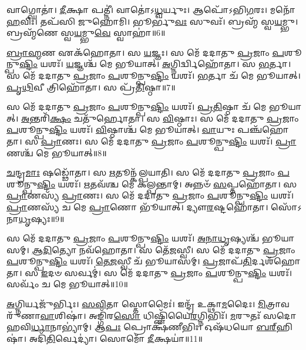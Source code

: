 𑌵𑌾𑌗𑍍𑌘𑍋𑌤𑌾॑। 
\-\ul{𑌦𑍀}\-𑌕𑍍𑌷𑌾 𑌪𑌤𑍍𑌨𑍀॑। 
𑌵𑌾𑌤𑍋॑𑌽\-\ul{𑌧𑍍𑌵}\-𑌰𑍍𑌯𑍁𑌃। 
𑌆𑌪𑍋᳴𑌽𑌭𑌿\-\ul{𑌗}\-𑌰𑌃। 
𑌮𑌨𑍋᳴ \ul{𑌹}\-𑌵𑌿𑌃। 
𑌤𑌪᳴𑌸𑌿 𑌜𑍁𑌹𑍋𑌮𑌿। 
𑌭𑍂𑌰𑍍𑌭𑍁\-\ul{𑌵𑌃} 𑌸𑍁𑌵𑌃᳴। 
𑌬𑍍𑌰𑌹𑍍𑌮᳴ 𑌸𑍍𑌵\-\ul{𑌯}\-𑌮𑍍𑌭𑍁। 
𑌬𑍍𑌰𑌹𑍍𑌮᳴𑌣𑍇 𑌸𑍍𑌵\-\ul{𑌯}\-𑌮𑍍𑌭𑍁\-\ul{𑌵𑍇} 𑌸𑍍𑌵𑌾𑌹𑌾॑॥6॥
\anuvakamend[𑌵𑌾𑌗𑍍𑌘𑍋\-\ul{𑌤𑌾} 𑌨𑌵᳴]

\-\ul{𑌬𑍍𑌰𑌾}\-\-\ul{𑌹𑍍𑌮}\-𑌣 𑌏𑌕᳴𑌹𑍋𑌤𑌾। 
𑌸 \ul{𑌯}\-𑌜𑍍𑌞𑌃। 
𑌸 𑌮𑍇᳴ 𑌦𑌦𑌾𑌤𑍁 \ul{𑌪𑍍𑌰}\-𑌜𑌾𑌂 \ul{𑌪}\-𑌶𑍂𑌨𑍍𑌪𑍁\-\ul{𑌷𑍍𑌟𑌿𑌂} 𑌯𑌶𑌃᳴। 
\-\ul{𑌯}\-𑌜𑍍𑌞𑌶𑍍𑌚᳴ 𑌮𑍇 𑌭𑍂𑌯𑌾𑌤𑍍। 
\-\ul{𑌅}\-𑌗𑍍𑌨𑌿𑌰𑍍𑌦𑍍𑌵𑌿𑌹𑍋᳴𑌤𑌾। 
𑌸 \ul{𑌭}\-𑌰𑍍𑌤𑌾। 
𑌸 𑌮𑍇᳴ 𑌦𑌦𑌾𑌤𑍁 \ul{𑌪𑍍𑌰}\-𑌜𑌾𑌂 \ul{𑌪}\-𑌶𑍂𑌨𑍍𑌪𑍁\-\ul{𑌷𑍍𑌟𑌿𑌂} 𑌯𑌶𑌃᳴। 
\-\ul{𑌭}\-𑌰𑍍𑌤𑌾 𑌚᳴ 𑌮𑍇 𑌭𑍂𑌯𑌾𑌤𑍍। 
\-\ul{𑌪𑍃}\-\-\ul{𑌥𑌿}\-𑌵𑍀 𑌤𑍍𑌰𑌿𑌹𑍋᳴𑌤𑌾। 
𑌸 𑌪𑍍𑌰᳴\-\ul{𑌤𑌿}\-𑌷𑍍𑌠𑌾॥7॥

𑌸 𑌮𑍇᳴ 𑌦𑌦𑌾𑌤𑍁 \ul{𑌪𑍍𑌰}\-𑌜𑌾𑌂 \ul{𑌪}\-𑌶𑍂𑌨𑍍𑌪𑍁\-\ul{𑌷𑍍𑌟𑌿𑌂} 𑌯𑌶𑌃᳴। 
\-\ul{𑌪𑍍𑌰}\-\-\ul{𑌤𑌿}\-𑌷𑍍𑌠𑌾 𑌚᳴ 𑌮𑍇 𑌭𑍂𑌯𑌾𑌤𑍍। 
\-\ul{𑌅}\-𑌨𑍍𑌤𑌰𑌿᳴\-\ul{𑌕𑍍𑌷𑌂} 𑌚𑌤𑍁᳴𑌰𑍍\mbox{}𑌹𑍋𑌤𑌾। 
𑌸 \ul{𑌵𑌿}\-𑌷𑍍𑌠𑌾𑌃। 
𑌸 𑌮𑍇᳴ 𑌦𑌦𑌾𑌤𑍁 \ul{𑌪𑍍𑌰}\-𑌜𑌾𑌂 \ul{𑌪}\-𑌶𑍂𑌨𑍍𑌪𑍁\-\ul{𑌷𑍍𑌟𑌿𑌂} 𑌯𑌶𑌃᳴। 
\-\ul{𑌵𑌿}\-𑌷𑍍𑌠𑌾𑌶𑍍𑌚᳴ 𑌮𑍇 𑌭𑍂𑌯𑌾𑌤𑍍। 
\-\ul{𑌵𑌾}\-𑌯𑍁𑌃 𑌪𑌞𑍍𑌚᳴𑌹𑍋𑌤𑌾। 
𑌸 \ul{𑌪𑍍𑌰𑌾}\-𑌣𑌃। 
𑌸 𑌮𑍇᳴ 𑌦𑌦𑌾𑌤𑍁 \ul{𑌪𑍍𑌰}\-𑌜𑌾𑌂 \ul{𑌪}\-𑌶𑍂𑌨𑍍𑌪𑍁\-\ul{𑌷𑍍𑌟𑌿𑌂} 𑌯𑌶𑌃᳴। 
\-\ul{𑌪𑍍𑌰𑌾}\-𑌣𑌶𑍍𑌚᳴ 𑌮𑍇 𑌭𑍂𑌯𑌾𑌤𑍍॥8॥

\-\ul{𑌚}\-𑌨𑍍𑌦𑍍𑌰\-\ul{𑌮𑌾𑌃} 𑌷𑌡𑍍𑌢𑍋᳴𑌤𑌾। 
𑌸 \ul{𑌋}\-𑌤𑍂𑌨𑍍𑌕᳴𑌲𑍍𑌪𑌯𑌾𑌤𑌿। 
𑌸 𑌮𑍇᳴ 𑌦𑌦𑌾𑌤𑍁 \ul{𑌪𑍍𑌰}\-𑌜𑌾𑌂 \ul{𑌪}\-𑌶𑍂𑌨𑍍𑌪𑍁\-\ul{𑌷𑍍𑌟𑌿𑌂} 𑌯𑌶𑌃᳴। 
\-\ul{𑌋}\-𑌤𑌵᳴𑌶𑍍𑌚 𑌮𑍇 𑌕𑌲𑍍𑌪𑌨𑍍𑌤𑌾𑌮𑍍। 
𑌅𑌨𑍍𑌨𑍞᳴ \ul{𑌸}\-𑌪𑍍𑌤𑌹𑍋᳴𑌤𑌾। 
𑌸 \ul{𑌪𑍍𑌰𑌾}\-𑌣𑌸𑍍𑌯᳴ \ul{𑌪𑍍𑌰𑌾}\-𑌣𑌃। 
𑌸 𑌮𑍇᳴ 𑌦𑌦𑌾𑌤𑍁 \ul{𑌪𑍍𑌰}\-𑌜𑌾𑌂 \ul{𑌪}\-𑌶𑍂𑌨𑍍𑌪𑍁\-\ul{𑌷𑍍𑌟𑌿𑌂} 𑌯𑌶𑌃᳴। 
\-\ul{𑌪𑍍𑌰𑌾}\-𑌣𑌸𑍍𑌯᳴ 𑌚 𑌮𑍇 \ul{𑌪𑍍𑌰𑌾}\-𑌣𑍋 𑌭𑍂᳴𑌯𑌾𑌤𑍍। 
𑌦𑍍𑌯𑍗\-\ul{𑌰}\-𑌷𑍍𑌟𑌹𑍋᳴𑌤𑌾। 
𑌸𑍋᳴𑌽𑌨𑌾\-\ul{𑌧𑍃}\-𑌷𑍍𑌯𑌃॥9॥

𑌸 𑌮𑍇᳴ 𑌦𑌦𑌾𑌤𑍁 \ul{𑌪𑍍𑌰}\-𑌜𑌾𑌂 \ul{𑌪}\-𑌶𑍂𑌨𑍍𑌪𑍁\-\ul{𑌷𑍍𑌟𑌿𑌂} 𑌯𑌶𑌃᳴। 
\-\ul{𑌅}\-\-\ul{𑌨𑌾}\-\-\ul{𑌧𑍃}\-𑌷𑍍𑌯𑌶𑍍𑌚᳴ 𑌭𑍂𑌯𑌾𑌸𑌮𑍍। 
\-\ul{𑌆}\-\-\ul{𑌦𑌿}\-𑌤𑍍𑌯𑍋 𑌨𑌵᳴𑌹𑍋𑌤𑌾। 
𑌸 𑌤𑍇᳴\-\ul{𑌜}\-𑌸𑍍𑌵𑍀। 
𑌸 𑌮𑍇᳴ 𑌦𑌦𑌾𑌤𑍁 \ul{𑌪𑍍𑌰}\-𑌜𑌾𑌂 \ul{𑌪}\-𑌶𑍂𑌨𑍍𑌪𑍁\-\ul{𑌷𑍍𑌟𑌿𑌂} 𑌯𑌶𑌃᳴। 
\-\ul{𑌤𑍇}\-\-\ul{𑌜}\-𑌸𑍍𑌵𑍀 𑌚᳴ 𑌭𑍂𑌯𑌾𑌸𑌮𑍍। 
\-\ul{𑌪𑍍𑌰}\-𑌜𑌾𑌪᳴\-\ul{𑌤𑌿}\-𑌰𑍍𑌦𑌶᳴𑌹𑍋𑌤𑌾। 
𑌸 \ul{𑌇}\-𑌦𑍞 𑌸𑌰𑍍𑌵𑌮𑍍॑। 
𑌸 𑌮𑍇᳴ 𑌦𑌦𑌾𑌤𑍁 \ul{𑌪𑍍𑌰}\-𑌜𑌾𑌂 \ul{𑌪}\-𑌶𑍂𑌨𑍍𑌪𑍁\-\ul{𑌷𑍍𑌟𑌿𑌂} 𑌯𑌶𑌃᳴। 
𑌸𑌰𑍍𑌵𑌂᳴ 𑌚 𑌮𑍇 𑌭𑍂𑌯𑌾𑌤𑍍॥10॥
\anuvakamend[\-\ul{𑌪𑍍𑌰}\-\-\ul{𑌤𑌿}\-𑌷𑍍𑌠𑌾 \ul{𑌪𑍍𑌰𑌾}\-𑌣𑌶𑍍𑌚᳴ 𑌮𑍇 𑌭𑍂𑌯𑌾𑌦𑌨𑌾\-\ul{𑌧𑍃}\-𑌷𑍍𑌯𑌃 𑌸𑌰𑍍𑌵𑌂᳴ 𑌚 𑌮𑍇 𑌭𑍂𑌯𑌾𑌤𑍍]

\-\ul{𑌅}\-𑌗𑍍𑌨𑌿𑌰𑍍𑌯𑌜𑍁᳴𑌰𑍍𑌭𑌿𑌃। 
\-\ul{𑌸}\-\-\ul{𑌵𑌿}\-𑌤𑌾 𑌸𑍍𑌤𑍋𑌮𑍈𑌃॑। 
𑌇𑌨𑍍𑌦𑍍𑌰᳴ 𑌉𑌕𑍍𑌥𑌾\-\ul{𑌮}\-𑌦𑍈𑌃। 
\-\ul{𑌮𑌿}\-𑌤𑍍𑌰𑌾𑌵𑌰𑍁᳴𑌣𑌾\-\-\ul{𑌵𑌾}\-𑌶𑌿𑌷𑌾॑। 
𑌅𑌙𑍍𑌗𑌿᳴𑌰\-\ul{𑌸𑍋} 𑌧𑌿𑌷𑍍𑌣𑌿᳴𑌯𑍈\-\ul{𑌰}\-𑌗𑍍𑌨𑌿𑌭𑌿𑌃᳴। 
\-\ul{𑌮}\-𑌰𑍁𑌤𑌃᳴ 𑌸𑌦𑍋𑌹𑌵𑌿\-\ul{𑌰𑍍𑌧𑌾}\-𑌨𑌾𑌭𑍍𑌯𑌾॑𑌮𑍍। 
𑌆\-\ul{𑌪𑌃} 𑌪𑍍𑌰𑍋𑌕𑍍𑌷᳴𑌣𑍀𑌭𑌿𑌃। 
𑌓𑌷᳴𑌧𑌯𑍋 \ul{𑌬}\-\-\ul{𑌰𑍍}\-‌𑌹𑌿𑌷𑌾॑। 
𑌅𑌦𑌿᳴\-\ul{𑌤𑌿}\-𑌰𑍍𑌵𑍇𑌦𑍍𑌯𑌾॑। 
𑌸𑍋𑌮𑍋᳴ \ul{𑌦𑍀}\-𑌕𑍍𑌷𑌯𑌾॑॥11॥

